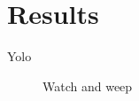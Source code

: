 \chapter{Results}

Yolo

\begin{figure*}[!t]
    \centering
    \resizebox{\textwidth}{!}{
        \subfloat{
            
            \label{fig:results:plot}
        }
    }
    \caption{Watch and weep}
\end{figure*}
